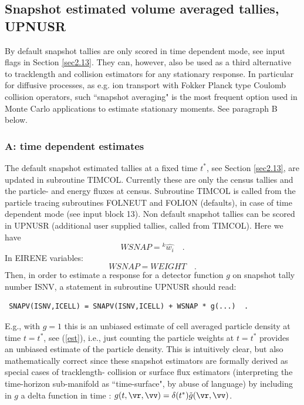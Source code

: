 \subsection{Snapshot estimated volume averaged tallies, UPNUSR}\label{sec3.2.3}

By default snapshot tallies are only scored in time dependent mode, see input flags in Section \ref{sec2.13}.
They can, however, also be used as a third alternative to tracklength and collision
estimators for any stationary response. In particular for diffusive processes, as e.g.
ion transport with Fokker Planck type Coulomb collision operators,
such ``snapshot averaging" is the most frequent option used in Monte Carlo applications to estimate
stationary moments. See paragraph B below.
\subsubsection{A: time dependent estimates}
The default
snapshot estimated tallies at a fixed time $t^*$, see Section
\ref{sec2.13}, are updated in subroutine TIMCOL. Currently these are
only the census tallies and the particle- and energy fluxes at
census. Subroutine TIMCOL is called from the particle tracing
subroutines FOLNEUT and FOLION (defaults), in case of time dependent
mode (see input block 13). Non default snapshot tallies can be
scored in UPNUSR (additional user supplied tallies, called from
TIMCOL). Here we have
\begin{displaymath}
WSNAP   =  {^k{\hat{w_i}}}   \quad .
\end{displaymath}
In EIRENE variables:
\begin{displaymath}
WSNAP = WEIGHT  \quad .
\end{displaymath}
Then, in order to estimate a response for a detector function $g$ on
snapshot tally number ISNV, a statement in subroutine UPNUSR should
read:
\begin{verbatim}
 SNAPV(ISNV,ICELL) = SNAPV(ISNV,ICELL) + WSNAP * g(...)  .
\end{verbatim}
E.g., with $g=1$ this is an unbiased estimate of cell averaged particle density at
time $t=t^*$, see (\ref{est}), i.e., just counting the particle weights at $t=t^*$
provides an unbiased estimate of the particle density.
This is intuitively clear, but also mathematically correct since
these snapshot estimators are formally derived as special cases of tracklength- collision
or surface flux estimators (interpreting the time-horizon sub-manifold as ``time-surface", by abuse of language)
by including in $g$ a delta function in time : $g(t,\vr,\vv)=\delta(t^*)\tilde g(\vr,\vv)$.

